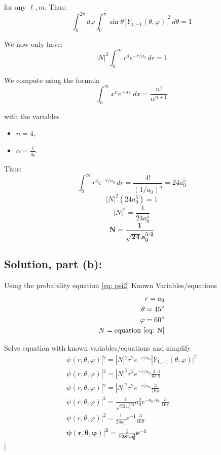\documentclass[12pt]{article}
\begin{document}
        for any \( \ell, m \). Thus:
        \[
            \int_0^{2\pi} d\varphi \int_0^{\pi} \sin\theta \, |Y_{1,-1}(\theta,\varphi)|^2 \, d\theta = 1
        \]

        We now only have:
        \[
            |N|^2 \int_0^\infty r^4 e^{-r/a_0} \, dr = 1
        \]

        We compute using the formula
        \[
            \int_0^\infty x^n e^{-\alpha x} \, dx = \frac{n!}{\alpha^{n+1}}
        \]

        with the variables
        \begin{itemize}
            \item \( n=4 \),
            \item \( \alpha = \frac{1}{a_0} \).
        \end{itemize}

        Thus:
        \[
            \int_0^\infty r^4 e^{-r/a_0} \, dr = \frac{4!}{(1/a_0)^5} = 24 a_0^5
        \]
        \[
        |N|^2 (24 a_0^5) = 1
        \]
        \[
        |N|^2 = \frac{1}{24 a_0^5}
        \]
        \begin{equation} \label{eq: N}
            \boldsymbol{\boxed{N = \frac{1}{\sqrt{24} a_0^{5/2}}}}
        \end{equation}

    \subsection{Solution, part (b):}
        Using the probability equation \ref{eq: psi2}
        \newline Known Variables/equations
        \begin{align*}
            r = a_0 \\
            \theta = 45 ^{\circ} \\
            \varphi = 60 ^{\circ} \\
            N = \text{equation \ref{eq: N}}
        \end{align*}

        Solve equation with known variables/equations and simplify
        \begin{align*}
            \psi(r,\theta,\varphi)|^2 = |N|^2 r^2 e^{-r/a_0} |Y_{1,-1}(\theta,\varphi)|^2 \\
            \psi(r,\theta,\varphi)|^2 = |N|^2 r^2 e^{-r/a_0} \frac{3}{8\pi} \frac{1}{2} \\
            \psi(r,\theta,\varphi)|^2 = |N|^2 r^2 e^{-r/a_0} \frac{3}{16\pi} \\
            \psi(r,\theta,\varphi)|^2 = \frac{1}{\sqrt{24} a_0^{5/2}} a_0^2 e^{-a_0/a_0} \frac{3}{16\pi} \\
            \psi(r,\theta,\varphi)|^2 = \frac{1}{24 a_0^3} e^{-1} \frac{3}{16\pi} \\
            \boldsymbol{\boxed{\psi(r,\theta,\varphi)|^2 = \frac{1}{128\pi a_0^3} e^{-1}}}
        \end{align*}|
\end{document}
